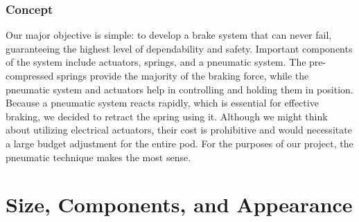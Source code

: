 \subsubsection{Concept}
Our major objective is simple: to develop a brake system that can never fail, guaranteeing the highest level of dependability and safety. Important components of the system include actuators, springs, and a pneumatic system. The pre-compressed springs provide the majority of the braking force, while the pneumatic system and actuators help in controlling and holding them in position.
Because a pneumatic system reacts rapidly, which is essential for effective braking, we decided to retract the spring using it. Although we might think about utilizing electrical actuators, their cost is prohibitive and would necessitate a large budget adjustment for the entire pod. For the purposes of our project, the pneumatic technique makes the most sense.





\section{Size, Components, and Appearance}

